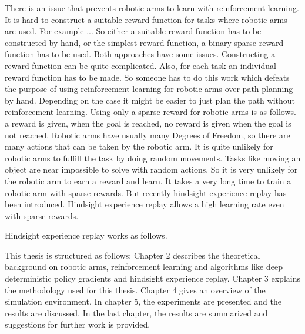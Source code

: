 There is an issue that prevents robotic arms to learn with reinforcement learning. It is hard to construct a suitable reward function for tasks where robotic arms are used. For example ... 
So either a suitable reward function has to be constructed by hand, or the simplest reward function, a binary sparse reward function has to be used. 
Both approaches have some issues. 
Constructing a reward function can be quite complicated. Also, for each task an individual reward function has to be made. So someone has to do this work which defeats the purpose of using reinforcement learning for robotic arms over path planning by hand. Depending on the case it might be easier to just plan the path without reinforcement learning.
Using only a sparse reward for robotic arms is as follows. a reward is given, when the goal is reached, no reward is given when the goal is not reached. Robotic arms have usually many Degrees of Freedom, so there are many actions that can be taken by the robotic arm. It is quite unlikely for robotic arms to fulfill the task by doing random movements. Tasks like moving an object are near impossible to solve with random actions. 
So it is very unlikely for the robotic arm to earn a reward and learn. It takes a very long time to train a robotic arm with sparse rewards.
But recently hindsight experience replay has been introduced. 
Hindsight experience replay allows a high learning rate even with sparse rewards. 


\vspace{0.5cm}


Hindsight experience replay works as follows.


\vspace{0.5cm}




\vspace{0.5cm}




This thesis is structured as follows: 
Chapter 2 describes the theoretical background on robotic arms, reinforcement learning and algorithms like deep deterministic policy gradients and hindsight experience replay. 
Chapter 3 explains the methodology used for this thesis.
Chapter 4 gives an overview of the simulation environment.
In chapter 5, the experiments are presented and the results are discussed.
In the last chapter, the results are summarized and suggestions for further work is provided.




